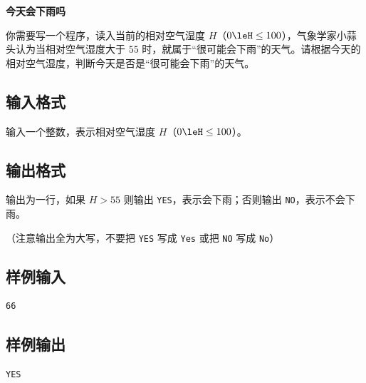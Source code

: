 \documentclass{article}
\newcommand{\problemname}[1]{\begin{center}\Large\bfseries #1\end{center}}
\begin{document}
\problemname{今天会下雨吗}

你需要写一个程序，读入当前的相对空气湿度 $H$（$0\leH\le100$），气象学家小蒜头认为当相对空气湿度大于 $55$ 时，就属于“很可能会下雨”的天气。请根据今天的相对空气湿度，判断今天是否是“很可能会下雨”的天气。

\subsection*{输入格式}
输入一个整数，表示相对空气湿度 $H$（$0\leH\le100$）。

\subsection*{输出格式}
输出为一行，如果 $H>55$ 则输出 \texttt{YES}，表示会下雨；否则输出 \texttt{NO}，表示不会下雨。

（注意输出全为大写，不要把 \texttt{YES} 写成 \texttt{Yes} 或把 \texttt{NO} 写成 \texttt{No}）

\subsection*{样例输入}
\begin{verbatim}
66
\end{verbatim}

\subsection*{样例输出}
\begin{verbatim}
YES
\end{verbatim}
\end{document}
